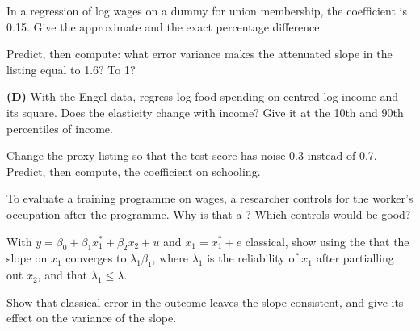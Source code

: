 \begin{exercise}[$\star\star$]\label{exo:b2:specification:5}
In a regression of log wages on a dummy for union membership, the coefficient is 0.15. Give the approximate and the exact
percentage difference.
\end{exercise}

\begin{exercise}[$\star\star$]\label{exo:b2:specification:6}
Predict, then compute: what error variance makes the attenuated slope in the listing equal to 1.6? To 1?
\end{exercise}

\begin{exercise}[$\star\star$]\label{exo:b2:specification:7}
\textbf{(D)} With the Engel data, regress log food spending on centred log income and its square. Does the elasticity
change with income? Give it at the 10th and 90th percentiles of income.
\end{exercise}

\begin{exercise}[$\star\star$]\label{exo:b2:specification:8}
Change the proxy listing so that the test score has noise 0.3 instead of 0.7. Predict, then compute, the coefficient on
schooling.
\end{exercise}

\begin{exercise}[$\star\star$]\label{exo:b2:specification:9}
To evaluate a training programme on wages, a researcher controls for the worker's occupation after the programme. Why is
that a ? Which controls would be good?
\end{exercise}

\begin{exercise}[$\star\star\star$]\label{exo:b2:specification:10}
With $y = \beta_0 + \beta_1x_1^* + \beta_2x_2 + u$ and $x_1 = x_1^* + e$ classical, show using the  that the slope on $x_1$ converges to $\lambda_1\beta_1$, where $\lambda_1$ is the reliability of $x_1$ after
partialling out $x_2$, and that $\lambda_1 \leq \lambda$.
\end{exercise}

\begin{exercise}[$\star\star\star$]\label{exo:b2:specification:11}
Show that classical error in the outcome leaves the slope consistent, and give its effect on the variance of the slope.
\end{exercise}

